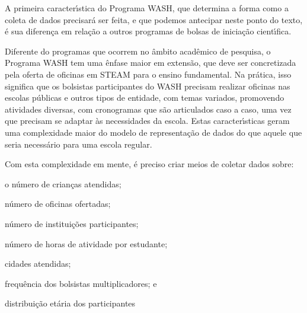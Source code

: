 \documentclass[
12pt,		%
openright,	%
twoside,  %
a4paper,			%
chapter=TITLE,		%
english,			%
french,				%
spanish,			%
brazil				%
]{USPSC-classe/USPSC}
\begin{document}
A primeira caracter\'{\i}stica do Programa WASH, que determina a forma como a coleta de dados precisar\'a ser feita, e que podemos antecipar neste ponto do texto, \'e sua diferen\c{c}a em rela\c{c}\~ao a outros programas de bolsas de inicia\c{c}\~ao cient\'{\i}fica.

















Diferente do programas que ocorrem no \^ambito acad\^emico de pesquisa, o Programa WASH tem uma \^enfase maior em extens\~ao, que deve ser concretizada pela oferta de oficinas em STEAM para o ensino fundamental. Na pr\'atica, isso significa que os bolsistas participantes do WASH precisam realizar oficinas nas escolas p\'ublicas e outros tipos de entidade, com temas variados, promovendo atividades diversas, com cronogramas que s\~ao articulados caso a caso, uma vez que precisam se adaptar \`as necessidades da escola. Estas caracter\'{\i}sticas geram uma complexidade maior do modelo de representa\c{c}\~ao de dados do que aquele que seria necess\'ario para uma escola regular.

















Com esta complexidade em mente, \'e preciso criar meios de coletar dados sobre:


















\begin{alineas}
\item o n\'umero de crian\c{c}as atendidas;
\item n\'umero de oficinas ofertadas;
\item n\'umero de institui\c{c}\~oes participantes;
\item n\'umero de horas de atividade por estudante;
\item cidades atendidas;
\item frequ\^encia dos bolsistas multiplicadores; e
\item distribui\c{c}\~ao et\'aria dos participantes
\end{alineas}
\end{document}
